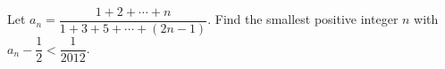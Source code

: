 Let $a_n=\dfrac{1+2+\cdots+n}{1+3+5+\cdots+(2n-1)}$. Find the smallest positive integer $n$ with $a_n-\dfrac12<\dfrac1{2012}$.
